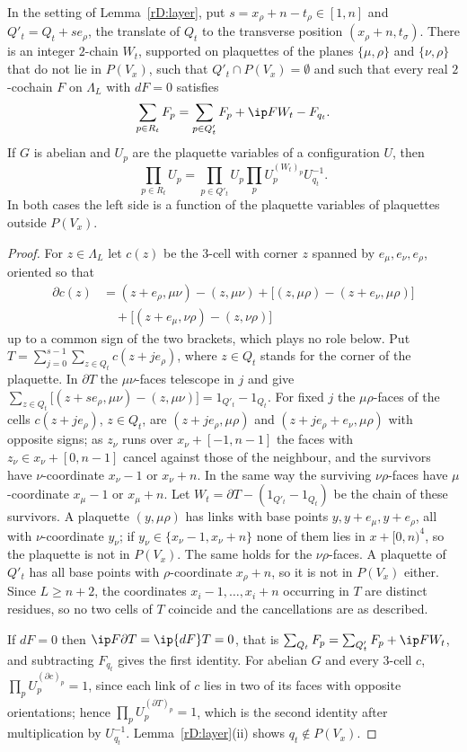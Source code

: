 \begin{lemma}[walls]\label{rD:walls}
In the setting of Lemma~\ref{rD:layer}, put $s=x_\rho+n-t_\rho\in[1,n]$ and
$Q'_t=Q_t+se_\rho$, the translate of $Q_t$ to the transverse position
$(x_\rho+n,t_\sigma)$. There is an integer $2$-chain $W_t$, supported on
plaquettes of the planes $\{\mu,\rho\}$ and $\{\nu,\rho\}$ that do not lie
in $P(V_x)$, such that $Q'_t\cap P(V_x)=\emptyset$ and such that every real
$2$-cochain $F$ on $\Lambda_L$ with $dF=0$ satisfies
\[
\sum_{p\in R_t}F_p=\sum_{p\in Q'_t}F_p+\ip F{W_t}-F_{q_t}.
\]
If $G$ is abelian and $U_p$ are the plaquette variables of a configuration
$U$, then
\[
\prod_{p\in R_t}U_p=\prod_{p\in Q'_t}U_p\prod_pU_p^{(W_t)_p}U_{q_t}^{-1}.
\]
In both cases the left side is a function of the plaquette variables of
plaquettes outside $P(V_x)$.
\end{lemma}

\begin{proof}
For $z\in\Lambda_L$ let $c(z)$ be the $3$-cell with corner $z$ spanned by
$e_\mu,e_\nu,e_\rho$, oriented so that
\[
\begin{split}
\partial c(z)&=(z+e_\rho,\mu\nu)-(z,\mu\nu)+\bigl[(z,\mu\rho)-(z+e_\nu,\mu
\rho)\bigr]\\
&\quad+\bigl[(z+e_\mu,\nu\rho)-(z,\nu\rho)\bigr]
\end{split}
\]
up to a common sign of the two brackets, which plays no role below. Put
$T=\sum_{j=0}^{s-1}\sum_{z\in Q_t}c(z+je_\rho)$, where $z\in Q_t$ stands for
the corner of the plaquette. In $\partial T$ the $\mu\nu$-faces telescope
in $j$ and give $\sum_{z\in Q_t}\bigl[(z+se_\rho,\mu\nu)-(z,\mu\nu)\bigr]=
1_{Q'_t}-1_{Q_t}$. For fixed $j$ the $\mu\rho$-faces of the cells $c(z+j
e_\rho)$, $z\in Q_t$, are $(z+je_\rho,\mu\rho)$ and $(z+je_\rho+e_\nu,\mu
\rho)$ with opposite signs; as $z_\nu$ runs over $x_\nu+[-1,n-1]$ the faces
with $z_\nu\in x_\nu+[0,n-1]$ cancel against those of the neighbour, and
the survivors have $\nu$-coordinate $x_\nu-1$ or $x_\nu+n$. In the same way
the surviving $\nu\rho$-faces have $\mu$-coordinate $x_\mu-1$ or $x_\mu+n$.
Let $W_t=\partial T-(1_{Q'_t}-1_{Q_t})$ be the chain of these survivors.
A plaquette $(y,\mu\rho)$ has links with base points $y,y+e_\mu,y+e_\rho$,
all with $\nu$-coordinate $y_\nu$; if $y_\nu\in\{x_\nu-1,x_\nu+n\}$ none of
them lies in $x+[0,n)^4$, so the plaquette is not in $P(V_x)$. The same
holds for the $\nu\rho$-faces. A plaquette of $Q'_t$ has all base points
with $\rho$-coordinate $x_\rho+n$, so it is not in $P(V_x)$ either. Since
$L\ge n+2$, the coordinates $x_i-1,\dots,x_i+n$ occurring in $T$ are
distinct residues, so no two cells of $T$ coincide and the cancellations
are as described.

If $dF=0$ then $\ip F{\partial T}=\ip{dF}T=0$, that is $\sum_{Q_t}F_p=
\sum_{Q'_t}F_p+\ip F{W_t}$, and subtracting $F_{q_t}$ gives the first
identity. For abelian $G$ and every $3$-cell $c$, $\prod_pU_p^{(\partial
c)_p}=1$, since each link of $c$ lies in two of its faces with opposite
orientations; hence $\prod_pU_p^{(\partial T)_p}=1$, which is the second
identity after multiplication by $U_{q_t}^{-1}$. Lemma~\ref{rD:layer}(ii)
shows $q_t\notin P(V_x)$.
\end{proof}

